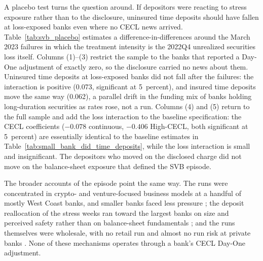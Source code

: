 A placebo test turns the question around.  If depositors were reacting
to stress exposure rather than to the disclosure, uninsured time
deposits should have fallen at loss-exposed banks even where no CECL
news arrived.  Table~\ref{tab:svb_placebo} estimates a
difference-in-differences around the March 2023 failures in which the
treatment intensity is the 2022Q4 unrealized securities loss itself.
Columns (1)--(3) restrict the sample to the banks that reported a
Day-One adjustment of exactly zero, so the disclosure carried no news
about them.  Uninsured time deposits at loss-exposed banks did not
fall after the failures: the interaction is positive (0.073,
significant at 5~percent), and insured time deposits move the same way
(0.062), a parallel drift in the funding mix of banks holding
long-duration securities as rates rose, not a run.  Columns (4) and
(5) return to the full sample and add the loss interaction to the
baseline specification: the CECL coefficients ($-0.078$ continuous,
$-0.406$ High-CECL, both significant at 5~percent) are essentially
identical to the baseline estimates in
Table~\ref{tab:small_bank_did_time_deposits}, while the loss
interaction is small and insignificant.  The depositors who moved on
the disclosed charge did not move on the balance-sheet exposure that
defined the SVB episode.

The broader accounts of the episode point the same way.  The runs
were concentrated in crypto- and venture-focused business models at a
handful of mostly West Coast banks, and smaller banks faced less
pressure \citep{kelly2025rushing}; the deposit reallocation of the
stress weeks ran toward the largest banks on size and perceived
safety rather than on balance-sheet fundamentals
\citep{caglio2024depositors}; and the runs themselves were wholesale,
with no retail run and almost no run risk at private banks
\citep{cipriani2024tracing}.  None of these mechanisms operates
through a bank's CECL Day-One adjustment.
